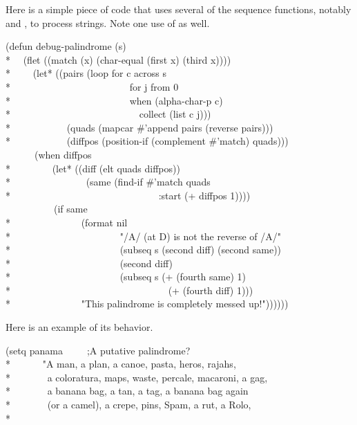\begin{newer}
Here is a simple piece of code that uses several of the sequence
functions, notably  and ,
to process strings.  Note one use of  as well.
\begin{lisp}
(defun debug-palindrome (s) \\*
~~(flet ((match (x) (char-equal (first x) (third x)))) \\*
~~~~(let* ((pairs (loop for c across s \\*
~~~~~~~~~~~~~~~~~~~~~~~~for j from 0 \\*
~~~~~~~~~~~~~~~~~~~~~~~~when (alpha-char-p c) \\*
~~~~~~~~~~~~~~~~~~~~~~~~~~collect (list c j))) \\*
~~~~~~~~~~~(quads (mapcar \#'append pairs (reverse pairs))) \\*
~~~~~~~~~~~(diffpos (position-if (complement \#'match) quads))) \\
~~~~~~(when diffpos \\*
~~~~~~~~(let* ((diff (elt quads diffpos)) \\*
~~~~~~~~~~~~~~~(same (find-if \#'match quads \\*
~~~~~~~~~~~~~~~~~~~~~~~~~~~~~~:start (+ diffpos 1)))) \\
~~~~~~~~~~(if same \\*
~~~~~~~~~~~~~~(format nil \\*
~~~~~~~~~~~~~~~~~~~~~~"/{\Xtilde}A/ (at {\Xtilde}D) is not the reverse of /{\Xtilde}A/" \\*
~~~~~~~~~~~~~~~~~~~~~~(subseq s (second diff) (second same)) \\*
~~~~~~~~~~~~~~~~~~~~~~(second diff) \\*
~~~~~~~~~~~~~~~~~~~~~~(subseq s (+ (fourth same) 1) \\*
~~~~~~~~~~~~~~~~~~~~~~~~~~~~~~~~(+ (fourth diff) 1))) \\*
~~~~~~~~~~~~~~"This palindrome is completely messed up!"))))))
\end{lisp}
Here is an example of its behavior.
\begin{lisp}
(setq panama~~~~~;{\rm A putative palindrome?} \\*
~~~~~~"A man, a plan, a canoe, pasta, heros, rajahs, \\*
~~~~~~~a coloratura, maps, waste, percale, macaroni, a gag, \\*
~~~~~~~a banana bag, a tan, a tag, a banana bag again \\*
~~~~~~~(or a camel), a crepe, pins, Spam, a rut, a Rolo, \\*

\end{lisp}
\end{newer}
